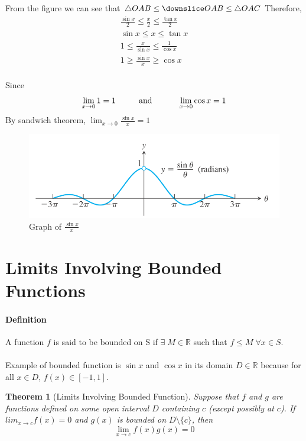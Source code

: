 \documentclass[12pt]{article}
\newcommand\tab[1][1cm]{\hspace*{#1}}
\newtheorem{theorem}{Theorem}
\begin{document}
From the figure we can see that $\triangle OAB \leq \downslice OAB \leq \triangle OAC$ Therefore,
\begin{align*} 
    \frac{\sin x}{2} \leq \frac{x}{2} \leq \frac{\tan x}{2} \\
    \sin x \leq x \leq \tan x \\
    1 \leq \frac{x}{\sin x} \leq \frac{1}{\cos x} \\
    1 \geq \frac{\sin x}{x} \geq \cos x \\
\end{align*}

\noindent
Since
\begin{align*} 
     \lim_{x \to 0} 1 = 1 \textrm{\tab and \tab} \lim_{x \to 0} \cos x = 1
\end{align*}
By sandwich theorem, $\lim_{x \to 0} \frac{\sin x}{x} = 1$
\begin{figure}[h!]
    \centering
    \includegraphics[width = 0.7\linewidth]{Images/limit trigonometry 1.png}
    \caption{Graph of $\frac{\sin x}{x}$}
\end{figure}

\section{Limits Involving Bounded Functions}
\paragraph{Definition} A function $f$ is said to be bounded on S if $\exists \; M \in \mathbb{R}$ such that
$f \leq M \; \forall x \in S$. \\ \\
Example of bounded function is $\sin x$ and $\cos x$ in its domain $D \in \mathbb{R}$ because for all $x \in D$, $f(x) \in [-1, 1]$.

\begin{theorem}[Limits Involving Bounded Function]
    \label{bounded limit}
    Suppose that $f$ and $g$ are functions defined on some open interval $D$ containing $c$ (except possibly at $c$). 
    If $lim_{x \to c} f(x) = 0$ and $g(x)$ is bounded on $D \setminus \{c\}$, then
    \[
        \lim_{x \to c} f(x)g(x) = 0
    \]
\end{theorem}
\end{document}
